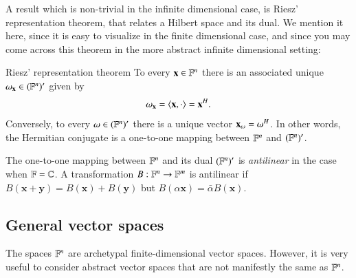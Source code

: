 A result which is non-trivial in the infinite dimensional case, is Riesz' representation theorem, that relates a Hilbert space and its dual. We mention it here, since it is easy to visualize in the finite dimensional case, and since you may come across this theorem in the more abstract infinite dimensional setting:
\begin{myTheorem}{Riesz' representation theorem}{}
    To every $\mathbf{x}\in \mathbb{F}^n$ there is an associated unique $\omega_{\mathbf{x}} \in (\mathbb{F}^n)'$ given by
    \begin{equation}
        \omega_{\mathbf{x}} = \braket{\mathbf{x}, \cdot} = \mathbf{x}^H.
    \end{equation}
    Conversely, to every $\omega \in (\mathbb{F}^n)'$ there is a unique vector $\mathbf{x}_\omega = \omega^H$.     In other words, the Hermitian conjugate is a one-to-one mapping between $\mathbb{F}^n$ and $(\mathbb{F}^n)'$.
\end{myTheorem}

The one-to-one mapping between $\mathbb{F}^n$ and its dual $(\mathbb{F}^n)'$ is \emph{antilinear} in the case when $\mathbb{F}=\mathbb{C}$. A transformation $B : \mathbb{F}^n\to \mathbb{F}^m$ is antilinear if $B(\mathbf{x} + \mathbf{y}) = B(\mathbf{x}) + B(\mathbf{y})$ but $B(\alpha\mathbf{x}) = \bar{\alpha}B(\mathbf{x})$. 

\subsection{General vector spaces}
\label{sec:general-finite-dimensional}

The spaces $\mathbb{F}^n$ are archetypal finite-dimensional vector spaces. However, it is very useful to consider abstract vector spaces that are not manifestly the same as $\mathbb{F}^n$. 

